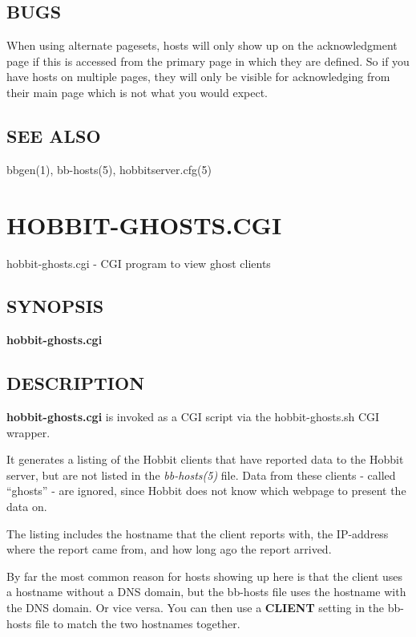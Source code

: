 \subsection{BUGS}
 When using alternate pagesets, hosts will only show up on the
 acknowledgment page if this is accessed from the primary page in
 which they are defined. So if you have hosts on multiple pages, they
 will only be visible for acknowledging from their main page which is
 not what you would expect. 

 
\subsection{SEE ALSO}
bbgen(1), bb-hosts(5), hobbitserver.cfg(5) 


%
\newpage
\section{HOBBIT-GHOSTS.CGI}
 hobbit-ghosts.cgi - CGI program to view ghost clients
 \subsection{SYNOPSIS}
\textbf{hobbit-ghosts.cgi}


 
\subsection{DESCRIPTION}
\textbf{hobbit-ghosts.cgi} is invoked as a CGI script via the hobbit-ghosts.sh CGI wrapper. 

  It generates a listing of the Hobbit clients that have reported data
  to the Hobbit server, but are not listed in the \emph{bb-hosts(5)}
  file. Data from these clients - called ``ghosts'' - are ignored,
  since Hobbit does not know which webpage to present the data on. 



  The listing includes the hostname that the client reports with, the
  IP-address where the report came from, and how long ago the report
  arrived. 



  By far the most common reason for hosts showing up here is that the
  client uses a hostname without a DNS domain, but the bb-hosts file
  uses the hostname with the DNS domain. Or vice versa. You can then
  use a \textbf{CLIENT} setting in the bb-hosts file to match the two
  hostnames together. 




